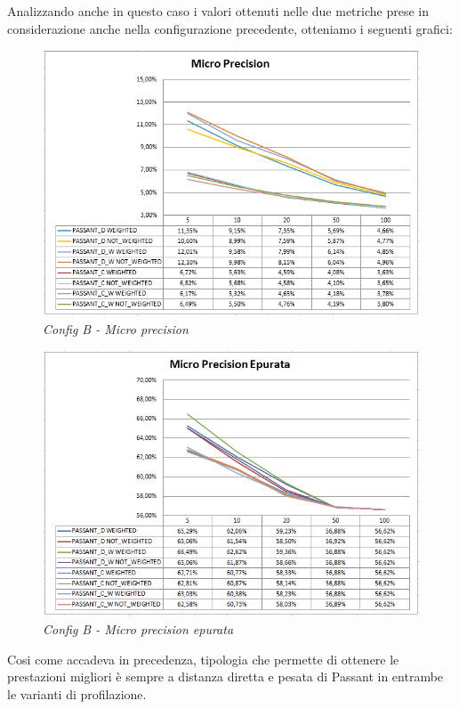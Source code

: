Analizzando anche in questo caso i valori ottenuti nelle due metriche prese in considerazione anche nella configurazione precedente, otteniamo i seguenti grafici:
\begin{figure}[H]
	\includegraphics[width=.9\textwidth]{./images/graphs/micro_prec_Musto}
	\caption{\emph{Config B - Micro precision}}
\end{figure}

\begin{figure}[H]
	\includegraphics[width=.9\textwidth]{./images/graphs/micro_precT_Musto}
	\caption{\emph{Config B - Micro precision epurata}}
\end{figure}
Cosi come accadeva in precedenza, tipologia che permette di ottenere le prestazioni migliori è sempre a distanza diretta e pesata di Passant in entrambe le varianti di profilazione.

